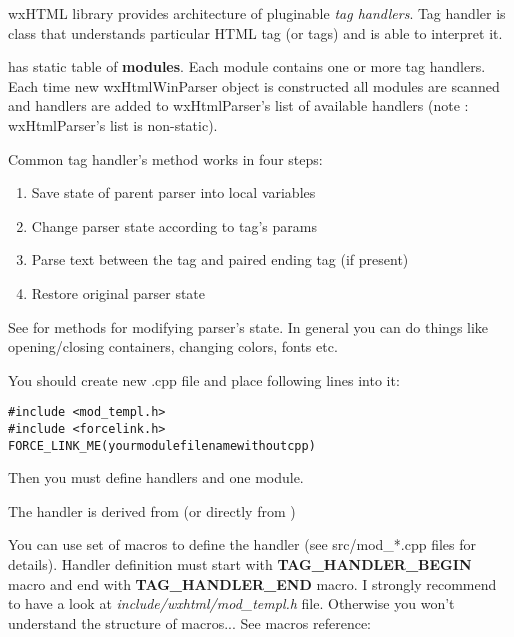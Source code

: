 \label{handlers}

wxHTML library provides architecture of pluginable {\it tag handlers}.
Tag handler is class that understands particular HTML tag (or tags) and is
able to interpret it.

 has static table of {\bf modules}.
Each module contains one or more tag handlers. Each time new wxHtmlWinParser
object is constructed all modules are scanned and handlers are added
to wxHtmlParser's list of available handlers (note : wxHtmlParser's list
is non-static).


Common tag handler's  method
works in four steps:

\begin{enumerate}
\item Save state of parent parser into local variables
\item Change parser state according to tag's params
\item Parse text between the tag and paired ending tag (if present)
\item Restore original parser state
\end{enumerate}

See  for methods for modifying
parser's state. In general you can do things like opening/closing containers,
changing colors, fonts etc.


You should create new .cpp file and place following lines into it: 

\begin{verbatim}
#include <mod_templ.h>
#include <forcelink.h>
FORCE_LINK_ME(yourmodulefilenamewithoutcpp)
\end{verbatim}

Then you must define handlers and one module.


The handler is derived from 
(or directly from )

You can use set of macros to define the handler (see src/mod\_*.cpp files
for details). Handler definition must start with {\bf TAG\_HANDLER\_BEGIN} macro
and end with {\bf TAG\_HANDLER\_END} macro. I strongly recommend to have a look
at {\it include/wxhtml/mod\_templ.h} file. Otherwise you won't understand
the structure of macros... See macros reference:

